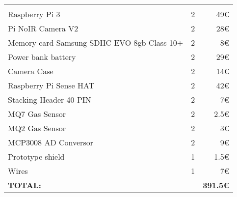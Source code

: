 \begin{tabular}{ |p{}P{.1\textwidth}r|}
	\hline
	 \\
	\hline
	\hline
		& 	&  \\
	\hline
	Raspberry Pi 3 					& 2 	& 49\euro{} \\ 
	\hline
	Pi NoIR Camera V2 				& 2 	& 28\euro{} \\ 
	\hline
	Memory card Samsung SDHC
	EVO 8gb Class 10+ 				& 2		& 8\euro{} \\ 
	\hline
	Power bank battery 				& 2 	& 29\euro{} \\ 
	\hline
	Camera Case		 				& 2 	& 14\euro{} \\ 
	\hline
	Raspberry Pi Sense HAT			& 2 	& 42\euro{} \\ 
	\hline
	Stacking Header 40 PIN 			& 2 	& 7\euro{} \\ 
	\hline
	MQ7 Gas Sensor		 			& 2 	& 2.5\euro{} \\ 
	\hline
	MQ2 Gas Sensor 					& 2 	& 3\euro{} \\ 
	\hline
	MCP3008 AD Conversor			& 2 	& 9\euro{} \\ 
	\hline
	Prototype shield  				& 1 	& 1.5\euro{} \\ 
	\hline
	Wires 							& 1 	& 7\euro{} \\ 
	
	\Xhline{2\arrayrulewidth}
	\textbf{TOTAL:} &  		& \textbf{391.5\euro{}} \\ 
	\hline

\end{tabular}
